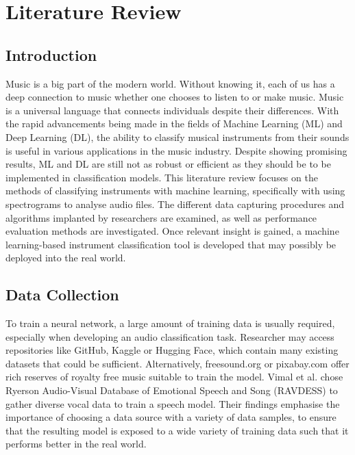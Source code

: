 % 
% 
% 
\chapter{Literature Review \label{ch:literature}}
\vspace{0.5cm}

\section{Introduction}

Music is a big part of the modern world. Without knowing it, each of us has a deep connection to music whether one chooses to listen to or make music. Music is a universal language that connects individuals despite their differences. With the rapid advancements being made in the fields of Machine Learning (ML) and Deep Learning (DL), the ability to classify musical instruments from their sounds is useful in various applications in the music industry. Despite showing promising results, ML and DL are still not as robust or efficient as they should be to be implemented in classification models. This literature review focuses on the methods of classifying instruments with machine learning, specifically with using spectrograms to analyse audio files. The different data capturing procedures and algorithms implanted by researchers are examined, as well as performance evaluation methods are investigated. Once relevant insight is gained, a machine learning-based instrument classification tool is developed that may possibly be deployed into the real world. 

\section{Data Collection}

To train a neural network, a large amount of training data is usually required, especially when developing an audio classification task. Researcher may access repositories like GitHub, Kaggle or Hugging Face, which contain many existing datasets that could be sufficient. Alternatively, freesound.org or pixabay.com offer rich reserves of royalty free music suitable to train the model. 
Vimal et al. chose Ryerson Audio-Visual Database of Emotional Speech and Song (RAVDESS) to gather diverse vocal data to train a speech model. Their findings emphasise the importance of choosing a data source with a variety of data samples, to ensure that the resulting model is exposed to a wide variety of training data such that it performs better in the real world. 

